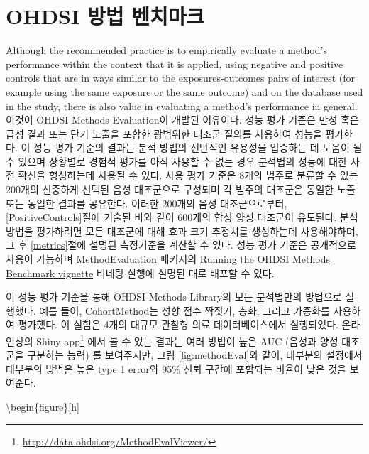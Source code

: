 \documentclass[11pt]{book}
\let\rmarkdownfootnote\footnote%
\def\footnote{\protect\rmarkdownfootnote}
\theoremstyle{definition}
\theoremstyle{definition}
\theoremstyle{definition}
\theoremstyle{remark}
\begin{document}
\section{OHDSI 방법 벤치마크}\label{ohdsi--}


Although the recommended practice is to empirically evaluate a method's
performance within the context that it is applied, using negative and
positive controls that are in ways similar to the exposures-outcomes
pairs of interest (for example using the same exposure or the same
outcome) and on the database used in the study, there is also value in
evaluating a method's performance in general. 이것이 OHDSI Methods
Evaluation이 개발된 이유이다. 성능 평가 기준은 만성 혹은 급성 결과 또는
단기 노출을 포함한 광범위한 대조군 질의를 사용하여 성능을 평가한다. 이
성능 평가 기준의 결과는 분석 방법의 전반적인 유용성을 입증하는 데 도움이
될 수 있으며 상황별로 경험적 평가를 아직 사용할 수 없는 경우 분석법의
성능에 대한 사전 확신을 형성하는데 사용될 수 있다. 사용 평가 기준은
8개의 범주로 분류할 수 있는 200개의 신중하게 선택된 음성 대조군으로
구성되며 각 범주의 대조군은 동일한 노출 또는 동일한 결과를 공유한다.
이러한 200개의 음성 대조군으로부터, \ref{PositiveControls}절에 기술된
바와 같이 600개의 합성 양성 대조군이 유도된다. 분석 방법을 평가하려면
모든 대조군에 대해 효과 크기 추정치를 생성하는데 사용해야하며, 그 후
\ref{metrics}절에 설명된 측정기준을 계산할 수 있다. 성능 평가 기준은
공개적으로 사용이 가능하며
\href{https://ohdsi.github.io/MethodEvaluation/}{MethodEvaluation}
패키지의
\href{https://ohdsi.github.io/MethodEvaluation/articles/OhdsiMethodsBenchmark.html}{Running
the OHDSI Methods Benchmark vignette} 비네팅 실행에 설명된 대로 배포할
수 있다.

이 성능 평가 기준을 통해 OHDSI Methods Library의 모든 분석법만의
방법으로 실행했다. 예를 들어, CohortMethod는 성향 점수 짝짓기, 층화,
그리고 가중화를 사용하여 평가했다. 이 실험은 4개의 대규모 관찰형 의료
데이터베이스에서 실행되었다. 온라인상의 Shiny app\footnote{\url{http://data.ohdsi.org/MethodEvalViewer/}}
에서 볼 수 있는 결과는 여러 방법이 높은 AUC (음성과 양성 대조군을
구분하는 능력) 를 보여주지만, 그림 \ref{fig:methodEval}와 같이, 대부분의
설정에서 대부분의 방법은 높은 type 1 error와 95\% 신뢰 구간에 포함되는
비율이 낮은 것을 보여준다.

\textbackslash{}begin\{figure\}{[}h{]}
\end{document}
